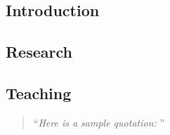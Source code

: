 
\newpage

\subsection{Introduction}
\blindtext

\subsection{Research}
\blindtext

\subsection{Teaching}
\blindtext


\begin{quotation}
``{\it \small Here is a sample quotation: \blindtext}''
\end{quotation}

